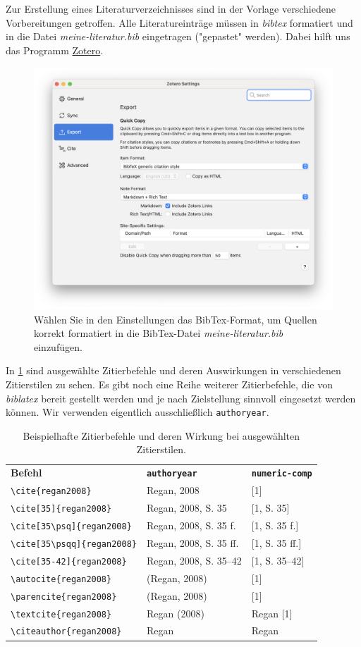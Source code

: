 Zur Erstellung eines Literaturverzeichnisses sind in der Vorlage verschiedene Vorbereitungen getroffen. Alle Literatureinträge müssen in \textit{bibtex} formatiert und in die Datei \textit{meine-literatur.bib} eingetragen ("gepastet" werden). Dabei hilft uns das Programm \href{https://www.zotero.org}{Zotero}.

\begin{figure}[h]
\centering
\includegraphics[width=.5\columnwidth]{zotero.png}
\caption{Wählen Sie in den Einstellungen das BibTex-Format, um Quellen korrekt formatiert in die BibTex-Datei \textit{meine-literatur.bib} einzufügen.}
\label{fig:zotero}
\end{figure}


In \cref{tab:citing} sind ausgewählte Zitierbefehle und deren Auswirkungen in verschiedenen Zitierstilen zu sehen. Es gibt noch eine Reihe weiterer Zitierbefehle, die von \textit{biblatex} bereit gestellt werden und je nach Zielstellung sinnvoll eingesetzt werden können. Wir verwenden eigentlich ausschließlich \texttt{authoryear}.
		
\begin{table}[!htb]
\small
\centering
\caption{Beispielhafte Zitierbefehle und deren Wirkung bei ausgewählten Zitierstilen.}
\label{tab:citing}
\begin{tabular}{lll}
\toprule
\textbf{Befehl} & \textbf{\texttt{authoryear}} & \textbf{\texttt{numeric-comp}} \\
\cmidrule(r){1-1}
\cmidrule(l){2-3}
\verb|\cite{regan2008}| & Regan, 2008 & [1] \\
\verb|\cite[35]{regan2008}| & Regan, 2008, S. 35 & [1, S. 35] \\
\verb|\cite[35\psq]{regan2008}| & Regan, 2008, S. 35 f. & [1, S. 35 f.] \\
\verb|\cite[35\psqq]{regan2008}| & Regan, 2008, S. 35 ff. & [1, S. 35 ff.] \\
\verb|\cite[35-42]{regan2008}| & Regan, 2008, S. 35–42 & [1, S. 35--42] \\
\verb|\autocite{regan2008}| & (Regan, 2008) & [1] \\
\verb|\parencite{regan2008}| & (Regan, 2008) & [1] \\
\verb|\textcite{regan2008}| & Regan (2008) & Regan [1] \\
\verb|\citeauthor{regan2008}| & Regan & Regan \\
\bottomrule
\end{tabular}
\end{table}


